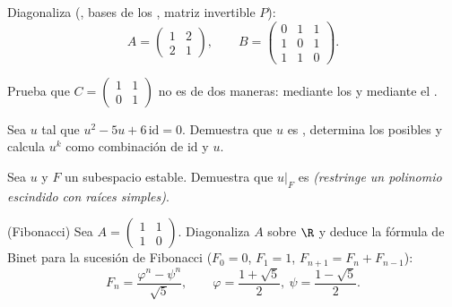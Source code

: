 \begin{exercise}[$\star$]\label{exo:b2:reduction:1}
Diagonaliza (, bases de los ,
matriz invertible $P$):
\[
A = \begin{pmatrix} 1 & 2\\ 2 & 1 \end{pmatrix},
\qquad
B = \begin{pmatrix} 0 & 1 & 1\\ 1 & 0 & 1\\ 1 & 1 & 0
\end{pmatrix}.
\]
\end{exercise}

\begin{exercise}[$\star$]\label{exo:b2:reduction:2}
Prueba que $C = \begin{pmatrix} 1 & 1\\ 0 & 1\end{pmatrix}$ no es
 de dos maneras: mediante los 
y mediante el .
\end{exercise}

\begin{exercise}[$\star$]\label{exo:b2:reduction:3}
Sea $u$ tal que $u^2 - 5u + 6\,\mathrm{id} = 0$. Demuestra que $u$ es
, determina los  posibles y calcula $u^k$
como combinación de $\mathrm{id}$ y $u$.
\end{exercise}

\begin{exercise}[$\star\star$]\label{exo:b2:reduction:4}
Sea $u$  y $F$ un subespacio estable. Demuestra que
$u|_F$ es  \emph{(restringe un polinomio 
escindido con raíces simples)}.
\end{exercise}

\begin{exercise}[$\star\star$]\label{exo:b2:reduction:5}
(Fibonacci) Sea $A = \begin{pmatrix} 1 & 1\\ 1 & 0\end{pmatrix}$.
Diagonaliza $A$ sobre $\R$ y deduce la fórmula de Binet para la
sucesión de Fibonacci ($F_0 = 0$, $F_1 = 1$, $F_{n+1} = F_n +
F_{n-1}$):
\[
F_n = \frac{\varphi^n - \psi^n}{\sqrt 5},
\qquad \varphi = \frac{1 + \sqrt5}{2},\ \psi = \frac{1 -
\sqrt5}{2}.
\]
\end{exercise}

